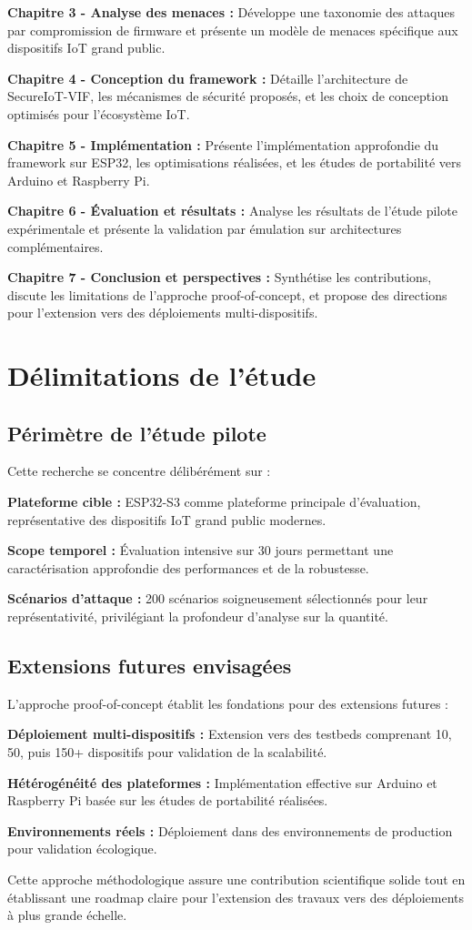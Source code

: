 \textbf{Chapitre 3 - Analyse des menaces :} Développe une taxonomie des attaques par compromission de firmware et présente un modèle de menaces spécifique aux dispositifs IoT grand public.

\textbf{Chapitre 4 - Conception du framework :} Détaille l'architecture de SecureIoT-VIF, les mécanismes de sécurité proposés, et les choix de conception optimisés pour l'écosystème IoT.

\textbf{Chapitre 5 - Implémentation :} Présente l'implémentation approfondie du framework sur ESP32, les optimisations réalisées, et les études de portabilité vers Arduino et Raspberry Pi.

\textbf{Chapitre 6 - Évaluation et résultats :} Analyse les résultats de l'étude pilote expérimentale et présente la validation par émulation sur architectures complémentaires.

\textbf{Chapitre 7 - Conclusion et perspectives :} Synthétise les contributions, discute les limitations de l'approche proof-of-concept, et propose des directions pour l'extension vers des déploiements multi-dispositifs.

\section{Délimitations de l'étude}

\subsection{Périmètre de l'étude pilote}

Cette recherche se concentre délibérément sur :

\textbf{Plateforme cible :} ESP32-S3 comme plateforme principale d'évaluation, représentative des dispositifs IoT grand public modernes.

\textbf{Scope temporel :} Évaluation intensive sur 30 jours permettant une caractérisation approfondie des performances et de la robustesse.

\textbf{Scénarios d'attaque :} 200 scénarios soigneusement sélectionnés pour leur représentativité, privilégiant la profondeur d'analyse sur la quantité.

\subsection{Extensions futures envisagées}

L'approche proof-of-concept établit les fondations pour des extensions futures :

\textbf{Déploiement multi-dispositifs :} Extension vers des testbeds comprenant 10, 50, puis 150+ dispositifs pour validation de la scalabilité.

\textbf{Hétérogénéité des plateformes :} Implémentation effective sur Arduino et Raspberry Pi basée sur les études de portabilité réalisées.

\textbf{Environnements réels :} Déploiement dans des environnements de production pour validation écologique.

Cette approche méthodologique assure une contribution scientifique solide tout en établissant une roadmap claire pour l'extension des travaux vers des déploiements à plus grande échelle.